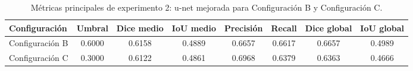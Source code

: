 \begin{table}[H]
    \centering
    \small
    \caption{Métricas principales de experimento 2: u-net mejorada para Configuración B y Configuración C.}
    \label{tab:experimento02unetmejorada_metricas_principales}
    \begin{tabular}{lccccccc}
        \toprule
        Configuración & Umbral & Dice medio & IoU medio & Precisión & Recall & Dice global & IoU global \\
        \midrule
        Configuración B & 0.6000 & 0.6158 & 0.4889 & 0.6657 & 0.6617 & 0.6657 & 0.4989 \\
        Configuración C & 0.3000 & 0.6122 & 0.4861 & 0.6968 & 0.6379 & 0.6363 & 0.4666 \\
        \bottomrule
    \end{tabular}
\end{table}
